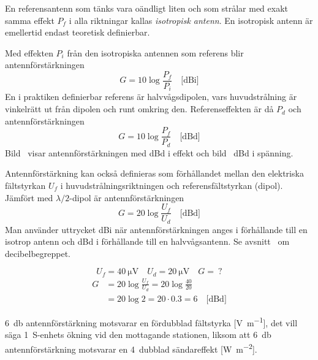 En referensantenn som tänks vara oändligt liten och som strålar med exakt
samma effekt \(P_f\) i alla riktningar kallas \emph{isotropisk antenn}.
En isotropisk antenn är emellertid endast teoretisk definierbar.

Med effekten \(P_i\) från den isotropiska antennen som referens blir
antennförstärkningen
\[G = 10 \log\frac{P_f}{P_i} \quad \text{[dBi]}\]
En i praktiken definierbar referens är halvvågsdipolen, vars
huvudstrålning är vinkelrätt ut från dipolen och runt omkring den.
Referenseffekten är då \(P_d\) och antennförstärkningen
\[G = 10 \log\frac{P_f}{P_d} \quad \text{[dBd]}\] %
Bild~ visar antennförstärkningen med dBd i effekt och
bild~ dBd i spänning.



Antennförstärkning kan också definieras som förhållandet mellan den elektriska
fältstyrkan \(U_f\) i huvudstrålningsriktningen och referensfältstyrkan (dipol).
Jämfört med \(\lambda/2\)-dipol är antennförstärkningen
\[G = 20 \log\frac{U_f}{U_d} \quad \text{[dBd]}\] %
Man använder uttrycket dBi när antennförstärkningen anges i förhållande till
en isotrop antenn och dBd i förhållande till en halvvågsantenn.
Se avsnitt~ om decibelbegreppet.

\begin{exempelbox}
\noindent
\[U_f = \qty{40}{\micro\volt} \quad U_d = \qty{20}{\micro\volt} \quad G =\ ?\]
\tcblower
\noindent
\begin{align*}
G &= 20 \log\frac{U_f}{U_d} = 20 \log\frac{40}{20} \\
  &= 20 \log 2 = 20\cdot 0.3 = 6 \quad \text{[dBd]}
\end{align*}
\end{exempelbox}

\qty{6}{\decibel} antennförstärkning motsvarar en fördubblad fältstyrka
[\unit{\volt\per\metre}], det vill säga 1~S-enhets ökning vid den mottagande
stationen, liksom att \qty{6}{\decibel} antennförstärkning motsvarar en 4~dubblad
sändareffekt [\unit{\watt\per\square\metre}].

